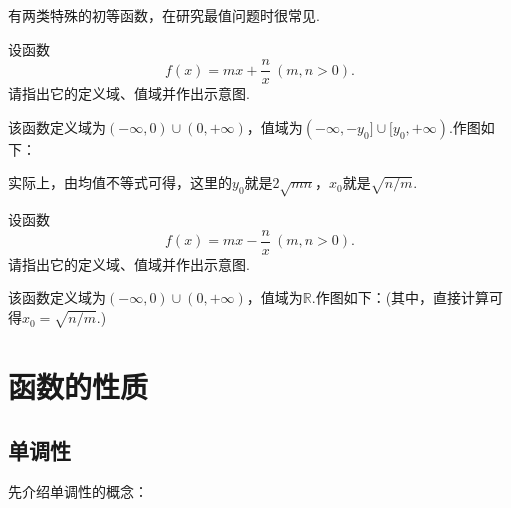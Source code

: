 \documentclass[lang=cn, zihao=5]{elegantbook}
\newcommand{\R}{\mathbb{R}}
\begin{document}
\newpage
有两类特殊的初等函数，在研究最值问题时很常见.

\begin{example}
    设函数$$f(x)=mx+\frac{n}{x}~(m,n>0).$$
    请指出它的定义域、值域并作出示意图.
\end{example}
\begin{solution}
	该函数定义域为$(-\infty ,0) \cup (0,+\infty)$，值域为$(-\infty ,-y_0] \cup [y_0 ,+\infty )$.作图如下：
    \begin{figure}[h!]
		\centering
		
	\end{figure}
	
	\noindent
	实际上，由均值不等式可得，这里的$y_0$就是$2\sqrt{mn}$，$x_0$就是$\sqrt{n/m}$.
\end{solution}

\begin{example}
    设函数$$f(x)=mx-\frac{n}{x}~(m,n>0).$$
    请指出它的定义域、值域并作出示意图.
\end{example}
\begin{solution}
	该函数定义域为$(-\infty ,0) \cup (0,+\infty)$，值域为$\R$.作图如下：(其中，直接计算可得$x_0=\sqrt{n/m}$.)
    \begin{figure}[h!]
		\centering
		
	\end{figure}
\end{solution}

\newpage
\section{函数的性质}

\subsection{单调性}

先介绍单调性的概念：
\end{document}
